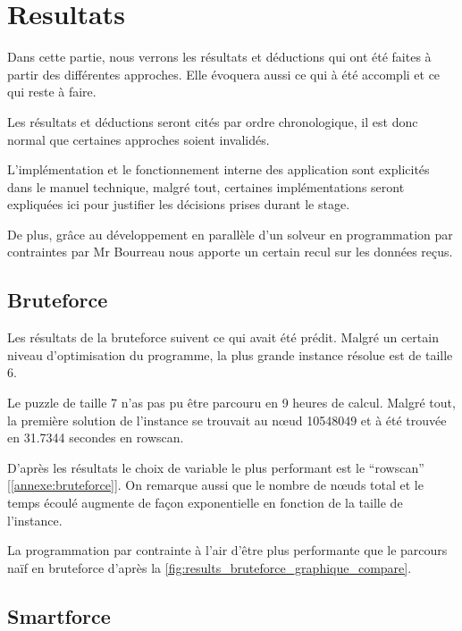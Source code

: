 \section{Resultats}

Dans cette partie, nous verrons les résultats et déductions qui ont été faites à partir des différentes approches. Elle évoquera aussi ce qui à été accompli et ce qui reste à faire.

Les résultats et déductions seront cités par ordre chronologique, il est donc normal que certaines approches soient invalidés.

L'implémentation et le fonctionnement interne des application sont explicités dans le manuel technique, malgré tout, certaines implémentations seront expliquées ici pour justifier les décisions prises durant le stage.

De plus, grâce au développement en parallèle d'un solveur en programmation par contraintes \autocite{choco} par Mr Bourreau nous apporte un certain recul sur les données reçus.

	\subsection{Bruteforce}
	
	Les résultats de la bruteforce suivent ce qui avait été prédit. Malgré un certain niveau d'optimisation du programme, la plus grande instance résolue est de taille 6.
	
	Le puzzle de taille 7 n'as pas pu être parcouru en 9 heures de calcul. Malgré tout, la première solution de l'instance se trouvait au n\oe ud 10548049 et à été trouvée en 31.7344 secondes en rowscan.
	
	D'après les résultats le choix de variable le plus performant est le \enquote{rowscan} [\autoref{annexe:bruteforce}]. On remarque aussi que le nombre de n\oe uds total et le temps écoulé augmente de façon exponentielle en fonction de la taille de l'instance.
	
	\begin{note}
		La programmation par contrainte à l'air d'être plus performante que le parcours naïf en bruteforce d'après la \autoref{fig:results_bruteforce_graphique_compare}.
	\end{note}
	
	\subsection{Smartforce}
	
